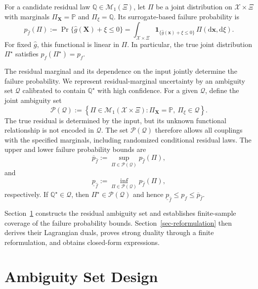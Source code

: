 \documentclass[review,11pt,3p,authoryear,nopreprintline]{elsarticle}
\begin{document}
For a candidate residual law $\mathbb Q\in\mathcal M_1(\Xi)$, let $\Pi$ be a joint distribution on $\mathcal X\times\Xi$ with marginals $\Pi_{\bm X}=\mathbb P$ and $\Pi_\xi=\mathbb Q$. Its surrogate-based failure probability is
\begin{equation}
  p_{\hat f}(\Pi):=\Pr\{\hat g(\bm X)+\xi\le0\}=\int_{\mathcal X\times\Xi}\mathbf 1_{\{\hat g(\bm x)+\xi\le0\}}\,\Pi(\mathrm d\bm x,\mathrm d\xi).
  \label{eq-surrogate-failure-probability}
\end{equation}
For fixed $\hat g$, this functional is linear in $\Pi$. In particular, the true joint distribution $\Pi^\star$ satisfies $p_{\hat f}(\Pi^\star)=p_f$.

The residual marginal and its dependence on the input jointly determine the failure probability. We represent residual-marginal uncertainty by an ambiguity set $\mathcal Q$ calibrated to contain $\mathbb Q^\star$ with high confidence. For a given $\mathcal Q$, define the joint ambiguity set
\[
  \mathcal P(\mathcal Q) :=\left\{\Pi\in\mathcal M_1(\mathcal X\times\Xi):\Pi_{\bm X}=\mathbb P,\ \Pi_\xi\in\mathcal Q\right\}.
\]
The true residual is determined by the input, but its unknown functional relationship is not encoded in $\mathcal Q$. The set $\mathcal P(\mathcal Q)$ therefore allows all couplings with the specified marginals, including randomized conditional residual laws. The upper and lower failure probability bounds are
\begin{equation}
  \overline p_{\hat f}:=\sup_{\Pi\in\mathcal P(\mathcal Q)}p_{\hat f}(\Pi),
  \label{eq-upper-bound}
\end{equation}
and
\begin{equation}
  \underline p_{\hat f}:=\inf_{\Pi\in\mathcal P(\mathcal Q)}p_{\hat f}(\Pi),
  \label{eq-lower-bound}
\end{equation}
respectively. If $\mathbb Q^\star\in\mathcal Q$, then $\Pi^\star\in\mathcal P(\mathcal Q)$ and hence $\underline p_{\hat f}\le p_f\le\overline p_{\hat f}$.


Section~\ref{sec-ambiguity-set} constructs the residual ambiguity set and establishes finite-sample coverage of the failure probability bounds. Section~\ref{sec-reformulation} then derives their Lagrangian duals, proves strong duality through a finite reformulation, and obtains closed-form expressions.


\section{Ambiguity Set Design}
\label{sec-ambiguity-set}
\end{document}
